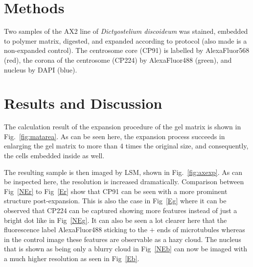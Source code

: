 \section{Methods}

Two samples of the AX2 line of \textit{Dictyostelium discoideum} was stained, embedded to polymer matrix, digested, and expanded according to protocol (also made is a non-expanded control).  
The centrosome core (CP91) is labelled by AlexaFluor568 (red), the corona of the centrosome (CP224) by AlexaFluor488 (green), and nucleus by DAPI (blue).

\section{Results and Discussion}

The calculation result of the expansion procedure of the gel matrix is shown in Fig.~\ref{fig:matarea}. 
As can be seen here, the expansion process succeeds in enlarging the gel matrix to more than 4 times the original size, and consequently, the cells embedded inside as well.  

The resulting sample is then imaged by LSM, shown in Fig.~\ref{fig:axexp}. 
As can be inspected here, the resolution is increased dramatically. 
Comparison between Fig~\ref{NEr} to Fig~\ref{Er} show that CP91 can be seen with a more prominent structure post-expansion. 
This is also the case in Fig~\ref{Eg} where it can be observed that CP224 can be captured showing more features instead of just a bright dot like in Fig~\ref{NEg}. 
It can also be seen a lot clearer here that the fluorescence label AlexaFluor488 sticking to the $+$ ends of microtubules whereas in the control image these features are observable as a hazy cloud. 
The nucleus that is shown as being only a blurry cloud in Fig~\ref{NEb} can now be imaged with a much higher resolution as seen in Fig~\ref{Eb}.

